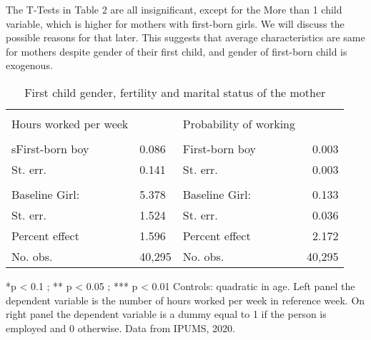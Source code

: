 \documentclass[12pt,draft,a4paper]{article}
\begin{document}
The T-Tests in Table 2 are all insignificant, except for the More than 1 child variable, which is higher for mothers with first-born girls.
We will discuss the possible reasons for that later.
This suggests that average characteristics are same for mothers despite gender of their first child, and gender of first-born child is exogenous.

\begin{table}[ht]%
    \caption{First child gender, fertility and marital status of the mother}

    
    \begin{tabularx}{\textwidth}{lXlr}
    
    \hline & \\[-1.0em]
    Hours worked per week & & Probability of working &  \\
    \hline & \\[-1.0em]
        sFirst-born boy          & 0.086           & First-born boy           & 0.003           \\
        St. err.                & 0.141           & St. err.                 & 0.003           \\
        \\[-1.0em]
        Baseline Girl:          & 5.378           & Baseline Girl:           & 0.133           \\
        St. err.                & 1.524           & St. err.                 & 0.036           \\
        Percent effect          & 1.596           & Percent effect           & 2.172           \\
        No. obs.                & 40,295          & No. obs.                 & 40,295          \\
    \hline
    \end{tabularx}

    *p < 0.1 ; ** p < 0.05 ; *** p < 0.01 Controls: quadratic in age. Left panel the dependent variable is the number of hours worked per week in reference week. On right panel the dependent variable is a dummy equal to 1 if the person is employed and 0 otherwise. Data from IPUMS, 2020. 
    \label{tab:work}
    \end{table}
\end{document}
